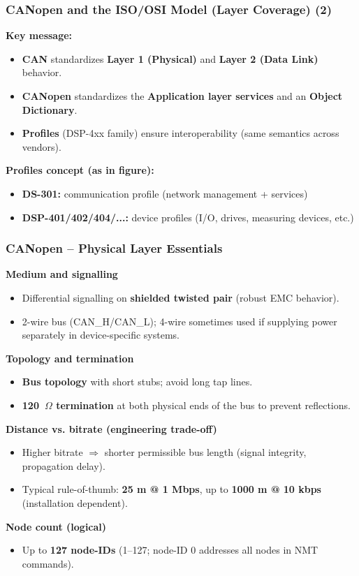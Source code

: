 \begin{frame}
	\frametitle{CANopen and the ISO/OSI Model (Layer Coverage) (2)}
	\textbf{Key message:}
	\begin{itemize}
		\item \textbf{CAN} standardizes \textbf{Layer 1 (Physical)} and \textbf{Layer 2 (Data Link)} behavior.
		\item \textbf{CANopen} standardizes the \textbf{Application layer services} and an \textbf{Object Dictionary}.
		\item \textbf{Profiles} (DSP-4xx family) ensure interoperability (same semantics across vendors).
	\end{itemize}
	\vspace{0.4em}
	\textbf{Profiles concept (as in figure):}
	\begin{itemize}
		\item \textbf{DS-301:} communication profile (network management + services)
		\item \textbf{DSP-401/402/404/...:} device profiles (I/O, drives, measuring devices, etc.)
	\end{itemize}
\end{frame}

\begin{frame}
	\frametitle{CANopen -- Physical Layer Essentials}
	\small
	\textbf{Medium and signalling}
	\begin{itemize}
		\item Differential signalling on \textbf{shielded twisted pair} (robust EMC behavior).
		\item 2-wire bus (CAN\_H/CAN\_L); 4-wire sometimes used if supplying power separately in device-specific systems.
	\end{itemize}
	\textbf{Topology and termination}
	\begin{itemize}
		\item \textbf{Bus topology} with short stubs; avoid long tap lines.
		\item \textbf{120~$\Omega$ termination} at both physical ends of the bus to prevent reflections.
	\end{itemize}
	\textbf{Distance vs. bitrate (engineering trade-off)}
	\begin{itemize}
		\item Higher bitrate $\Rightarrow$ shorter permissible bus length (signal integrity, propagation delay).
		\item Typical rule-of-thumb: \textbf{25 m @ 1 Mbps}, up to \textbf{1000 m @ 10 kbps} (installation dependent).
	\end{itemize}
	\textbf{Node count (logical)}
	\begin{itemize}
		\item Up to \textbf{127 node-IDs} (1--127; node-ID 0 addresses all nodes in NMT commands).
	\end{itemize}
\end{frame}

